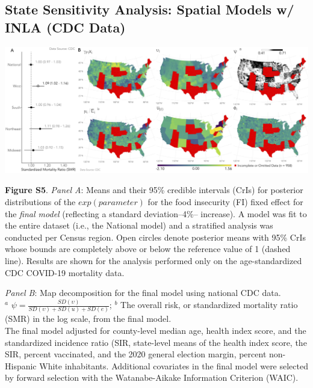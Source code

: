 \documentclass[aspectratio=169]{beamer}
\begin{document}
\subsection{State Sensitivity Analysis: Spatial Models w/ INLA (CDC Data)}
\begin{frame}
	
	
	
	\vspace*{-0.02 cm}
	\hspace*{-0.45 cm}
	\centering
	\includegraphics[scale=0.117]{images-logos/sensitivity-combo-forest-map-decomp-cdc.png}
	
	\raggedright
	\tiny{\textbf{Figure S5}. \textit{Panel A}: Means and their 95\% credible intervals (CrIs) for posterior distributions of the $exp(parameter)$ for the food insecurity (FI) fixed effect for the \textit{final model} (reflecting a standard deviation--4\%-- increase). A model was fit to the entire dataset (i.e., the National model) and a stratified analysis was conducted per Census region. Open circles denote posterior means with 95\% CrIs whose bounds are completely above or below the reference value of 1 (dashed line). Results are shown for the analysis performed only on the age-standardized CDC COVID-19 mortality data. 
		
		\vspace{0.25cm}
		
		\textit{Panel B}: Map decomposition for the final model using national CDC data.\\
		$^a$ $\psi=\frac{SD(\upsilon)}{SD(\upsilon)+SD(u)+SD(e)}$;
		$^b$ The overall risk, or standardized mortality ratio (SMR) in the log scale, from the final model.\\
		The final model adjusted for county-level median age, health index score, and the standardized incidence ratio (SIR, state-level means of the health index score, the SIR, percent vaccinated, and the 2020 general election margin, percent non-Hispanic White inhabitants. Additional covariates in the final model were selected by forward selection with the Watanabe-Aikake Information Criterion (WAIC).}
	
	
\end{frame}
	
\end{document}
